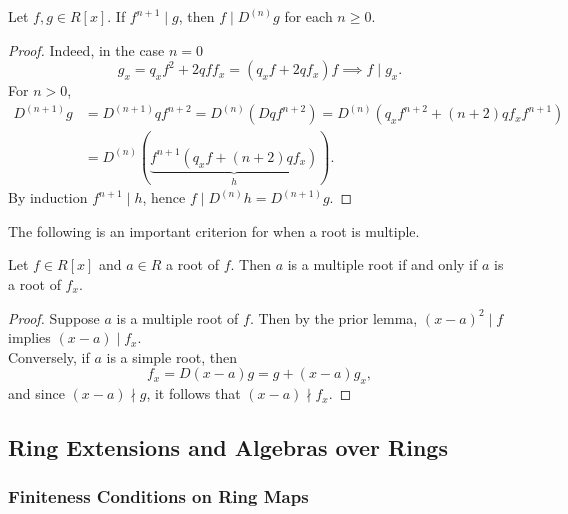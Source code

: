 \begin{lemma}
    Let $f,g\in R[x]$. If $f^{n+1}\mid g$, then $f\mid D^{(n)} g$ for each $n\geq 0$. 
\end{lemma}
\begin{proof}
    Indeed, in the case $n=0$ 
    $$
        g_x = q_xf^2+2qff_x= (q_xf+2qf_x)f \implies f \mid g_x.
    $$
    For $n>0$,
    \begin{align*}
        D^{(n+1)}g &= D^{(n+1)} qf^{n+2} = D^{(n)}\left(Dqf^{n+2}\right) = D^{(n)}\left(q_xf^{n+2}+(n+2)qf_xf^{n+1}\right)\\
        &= D^{(n)}\left(\underbrace{f^{n+1}(q_xf+(n+2)qf_x)}_{h}\right).
    \end{align*}
    By induction $f^{n+1}\mid h$, hence $f\mid D^{(n)} h = D^{(n+1)} g$. 
\end{proof}
The following is an important criterion for when a root is multiple.
\begin{lemma}\label{MultipleRootsInTermsOfDerivative}
    Let $f\in R[x]$ and $a\in R$ a root of $f$. Then $a$ is a multiple root if and only if $a$ is a root of $f_x$. 
\end{lemma}
\begin{proof}
    Suppose $a$ is a multiple root of $f$. Then by the prior lemma, $(x-a)^2\mid f$ implies $(x-a) \mid f_x$.\\
    Conversely, if $a$ is a simple root, then 
    $$
        f_x = D (x-a)g = g + (x-a)g_x,
    $$  
    and since $(x-a)\nmid g$, it follows that $(x-a)\nmid f_x$. 
\end{proof}
\subsection{Ring Extensions and Algebras over Rings} 
\subsubsection{Finiteness Conditions on Ring Maps}
